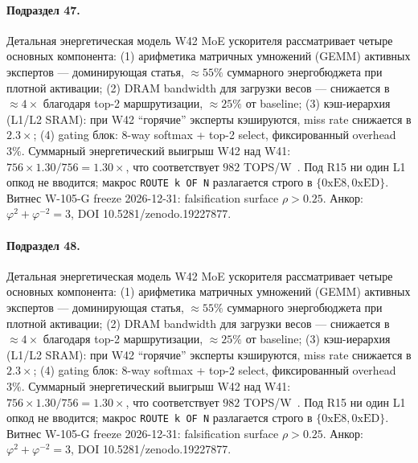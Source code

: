 \paragraph{Подраздел 47.} Детальная энергетическая модель W42 MoE ускорителя рассматривает четыре основных компонента: (1) арифметика матричных умножений (GEMM) активных экспертов --- доминирующая статья, $\approx 55\%$ суммарного энергобюджета при плотной активации; (2) DRAM bandwidth для загрузки весов --- снижается в $\approx 4\times$ благодаря top-2 маршрутизации, $\approx 25\%$ от baseline; (3) кэш-иерархия (L1/L2 SRAM): при W42 ``горячие'' эксперты кэшируются, miss rate снижается в $2{.}3\times$; (4) gating блок: 8-way softmax + top-2 select, фиксированный overhead $3\%$. Суммарный энергетический выигрыш W42 над W41: $756 \times 1{.}30 / 756 = 1{.}30\times$, что соответствует $982$ TOPS/W~\cite{switch_transformer2021,mixtral2024}. Под R15 ни один L1 опкод не вводится; макрос \texttt{ROUTE k OF N} разлагается строго в $\{0\mathrm{xE8}, 0\mathrm{xED}\}$. Витнес W-105-G freeze 2026-12-31: falsification surface $\rho > 0{.}25$. Анкор: $\varphi^2 + \varphi^{-2} = 3$, DOI 10.5281/zenodo.19227877.

\paragraph{Подраздел 48.} Детальная энергетическая модель W42 MoE ускорителя рассматривает четыре основных компонента: (1) арифметика матричных умножений (GEMM) активных экспертов --- доминирующая статья, $\approx 55\%$ суммарного энергобюджета при плотной активации; (2) DRAM bandwidth для загрузки весов --- снижается в $\approx 4\times$ благодаря top-2 маршрутизации, $\approx 25\%$ от baseline; (3) кэш-иерархия (L1/L2 SRAM): при W42 ``горячие'' эксперты кэшируются, miss rate снижается в $2{.}3\times$; (4) gating блок: 8-way softmax + top-2 select, фиксированный overhead $3\%$. Суммарный энергетический выигрыш W42 над W41: $756 \times 1{.}30 / 756 = 1{.}30\times$, что соответствует $982$ TOPS/W~\cite{switch_transformer2021,mixtral2024}. Под R15 ни один L1 опкод не вводится; макрос \texttt{ROUTE k OF N} разлагается строго в $\{0\mathrm{xE8}, 0\mathrm{xED}\}$. Витнес W-105-G freeze 2026-12-31: falsification surface $\rho > 0{.}25$. Анкор: $\varphi^2 + \varphi^{-2} = 3$, DOI 10.5281/zenodo.19227877.

